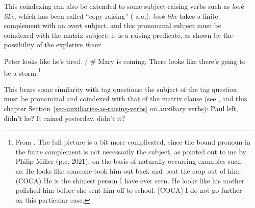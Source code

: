 This coindexing can also be extended to some subject-raising verbs such as \emph{look like}, which
has been called ``copy raising'' (\citealp{Rogers74a-u,Hornstein99a-u} a.o.): \emph{look like} takes a finite
complement with an overt subject, and this pronominal subject must be coindexed with the matrix
subject;
it is a raising predicate, as shown by the possibility of the expletive \emph{there}:

\eal
\ex Peter looks like he's tired. / \# Mary is coming.
\ex There looks like there's going to be a storm.\footnote{
From \citet[]{Sag2007a}. The full picture is a bit more complicated, since the bound pronoun in
the finite complement is not necessarily the subject, as pointed out to me by Philip Miller
(p.c. 2021), on the basis of naturally occurring examples such as: 
\eal
\ex He looks like someone took him out back and beat the crap out of him. (COCA)
\ex He is the shiniest person I have ever seen. He looks like his mother polished him before she sent
him off to school. (COCA) 
\zl
I do not go further on this particular case.
}
\zl



This bears some similarity with  tag questions: the  subject of the tag question must be
pronominal and coindexed with that of the matrix clause (see \citealt{BF99a}, and this chapter Section~\ref{sec-auxiliaries-as-raising-verbs} on auxiliary verbs):
\eal \label{extag}
\ex Paul left, didn't he?\label{ex-paul-left-didnt-he}
\ex It rained yesterday, didn't it?
\zl

